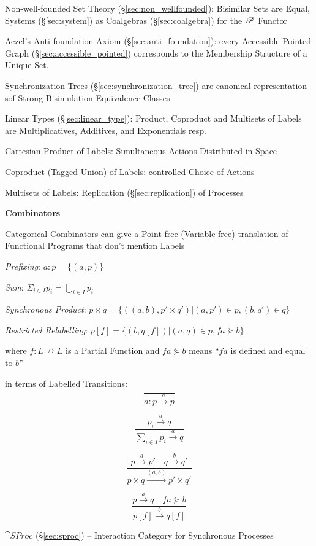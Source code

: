 Non-well-founded Set Theory (\S\ref{sec:non_wellfounded}): Bisimilar
Sets are Equal, Systems (\S\ref{sec:system}) as Coalgebras
(\S\ref{sec:coalgebra}) for the $\mathscr{P}$ Functor

Aczel's Anti-foundation Axiom (\S\ref{sec:anti_foundation}): every
Accessible Pointed Graph (\S\ref{sec:accessible_pointed}) corresponds
to the Membership Structure of a Unique Set.

Synchronization Trees (\S\ref{sec:synchronization_tree}) are canonical
representation sof Strong Bisimulation Equivalence Classes

Linear Types (\S\ref{sec:linear_type}): Product, Coproduct and
Multisets of Labels are Multiplicatives, Additives, and Exponentials
resp.

Cartesian Product of Labels: Simultaneous Actions Distributed in Space

Coproduct (Tagged Union) of Labels: controlled Choice of Actions

Multisets of Labels: Replication (\S\ref{sec:replication}) of
Processes


\textbf{Combinators}

Categorical Combinators can give a Point-free (Variable-free)
translation of Functional Programs that don't mention Labels

\emph{Prefixing}: $a:p = \{(a,p)\}$

\emph{Sum}: $\Sigma_{i \in I} p_i = \bigcup_{i \in I} p_i$

\emph{Synchronous Product}:
$p \times q = \{((a,b), p' \times q') | (a,p') \in p, (b,q') \in q\}$

\emph{Restricted Relabelling}:
$p[f] = \{(b,q[f]) | (a,q) \in p, f a \curlyeqsucc b\}$

where $f : L \nrightarrow L$ is a Partial Function and $f a
\curlyeqsucc b$ means ``$f a$ is defined and equal to $b$''

in terms of Labelled Transitions:
\[
  \frac{}
  {a : p \xrightarrow{a} p}
\]

\[
  \frac{p_i \xrightarrow{a} q}
  {\sum_{i \in I} p_i \xrightarrow{a} q}
\]

\[
  \frac{p \xrightarrow{a} p' \quad q \xrightarrow{b} q'}
  {p \times q \xrightarrow{(a,b)} p' \times q'}
\]

\[
  \frac{p \xrightarrow{a} q \quad f a \curlyeqsucc b}
  {p[f] \xrightarrow{b} q[f]}
\]


\asterism


$\cat{SProc}$ (\S\ref{sec:sproc}) -- Interaction Category for
Synchronous Processes

